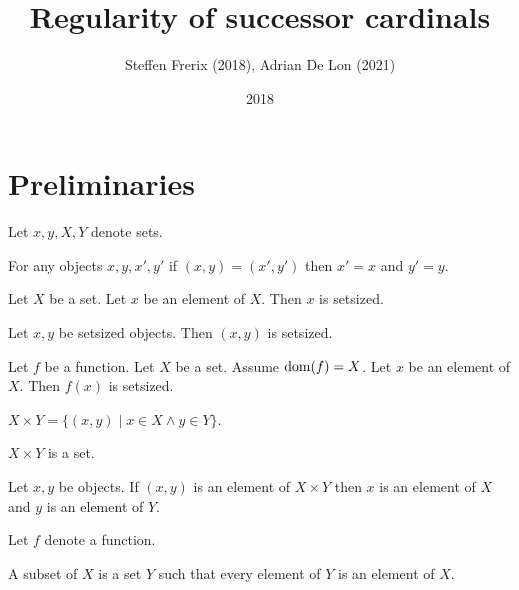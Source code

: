 \documentclass{article}
\title{Regularity of successor cardinals}
\author{Steffen Frerix (2018), Adrian De Lon (2021)}
\date{2018}
\newcommand{\Prod}[2]{#1\times #2}
\begin{document}

  \maketitle

  \section{Preliminaries}

  \begin{forthel}

    Let $x, y, X, Y$ denote sets.

    \begin{axiom}
      For any objects $x,y,x',y'$ if $(x, y) = (x', y')$ then $x' = x$ and $y' = y$.
    \end{axiom}

    \begin{axiom}
      Let $X$ be a set.
      Let $x$ be an element of $X$. Then $x$ is setsized.
    \end{axiom}

    \begin{axiom}
      Let $x,y$ be setsized objects. Then $(x, y)$ is setsized.
    \end{axiom}

    \begin{axiom}
      Let $f$ be a function.
      Let $X$ be a set.
      Assume $\operatorname{dom}(f) = X$.
      Let $x$ be an element of $X$. Then $f(x)$ is setsized.
    \end{axiom}

    \begin{definition}
      $\Prod{X}{Y} = \{(x,y) \mid x \in X \wedge y \in Y\}$.
    \end{definition}

    \begin{axiom}
      $\Prod{X}{Y}$ is a set.
    \end{axiom}

    \begin{lemma}
      Let $x,y$ be objects.
      If $(x,y)$ is an element of $\Prod{X}{Y}$
      then $x$ is an element of $X$ and $y$ is an element of $Y$.
    \end{lemma}

    Let $f$ denote a function.

    \begin{definition}
      A subset of $X$ is a set $Y$ such that every element of $Y$ is an element of $X$.
    \end{definition}


\end{forthel}
\end{document}
